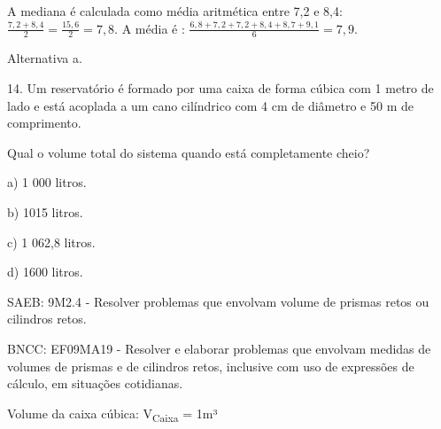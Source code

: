 \begin{escolha}
\begin{boxmedio}
\begin{boxmedio}
{\begin{boxpeq}
\begin{boxpeq}
{\begin{boxpeq}
\begin{boxmedio}
\begin{boxmedio}
\begin{boxpeq}
\begin{boxmedio}
\begin{boxpeq}
\begin{boxpeq}
\begin{boxpeq}
\begin{boxpeq}
\begin{boxmedio}
{\begin{boxmedio}
\begin{boxmedio}
\begin{boxpeq}
\begin{boxmedio}
\begin{boxpeq}
\begin{boxpeq}
\begin{boxpeq}
\begin{escolha}
{\begin{boxmedio}
\begin{boxpeq}
\begin{boxpeq}
\begin{boxpeq}
\begin{boxpeq}
\begin{boxpeq}
\begin{boxmedio}
\begin{boxpeq}
\begin{boxpeq}
\begin{boxpeq}
{\begin{boxpeq}
\begin{boxmedio}
\begin{boxpeq}
\begin{boxpeq}
\begin{boxpeq}
{\begin{boxpeq}
\begin{boxmedio}
{\begin{boxpeq}
\begin{boxpeq}
\begin{boxmedio}
\begin{boxmedio}
\begin{boxpeq}
\begin{boxpeq}
{\begin{boxpeq}
\begin{boxpeq}
\begin{boxpeq}
\begin{boxpeq}
\begin{boxpeq}
\begin{escolha}
\begin{escolha}
{\begin{boxmedio}
\begin{boxpeq}
\begin{q°}
\begin{boxmedio}
\begin{boxpeq}
\begin{boxpeq}
\begin{boxmedio}
\begin{boxmedio}
\begin{boxmedio}
\begin{boxmedio}
{\begin{escolha}
\begin{escolha}
\begin{escolha}
\begin{escolha}
\begin{escolha}
\begin{escolha}
{A mediana é calculada como média aritmética entre 7,2 e 8,4:
$\frac{7,2 + 8,4}{2} = \frac{15,6}{2} = 7,8$. A média é :
$\frac{6,8 + 7,2 + 7,2 + 8,4 + 8,7 + 9,1}{6} = 7,9$.

Alternativa a.

14. Um reservatório é formado por uma caixa de forma cúbica com 1 metro
de lado e está acoplada a um cano cilíndrico com 4 cm de diâmetro e 50 m
de comprimento.

Qual o volume total do sistema quando está completamente cheio?

a) 1 000 litros.

b) 1015 litros.

c) 1 062,8 litros.

d) 1600 litros.

SAEB: 9M2.4 - Resolver problemas que envolvam volume de prismas retos ou
cilindros retos.

BNCC: EF09MA19 - Resolver e elaborar problemas que envolvam medidas de
volumes de prismas e de cilindros retos, inclusive com uso de expressões
de cálculo, em situações cotidianas.

Volume da caixa cúbica: V\textsubscript{Caixa} = 1m³

}
\end{escolha}
\end{escolha}
\end{escolha}
\end{escolha}
\end{escolha}
\end{escolha}}
\end{boxmedio}
\end{boxmedio}
\end{boxmedio}
\end{boxmedio}
\end{boxpeq}
\end{boxpeq}
\end{boxmedio}
\end{q°}
\end{boxpeq}
\end{boxmedio}}
\end{escolha}
\end{escolha}
\end{boxpeq}
\end{boxpeq}
\end{boxpeq}
\end{boxpeq}
\end{boxpeq}}
\end{boxpeq}
\end{boxpeq}
\end{boxmedio}
\end{boxmedio}
\end{boxpeq}
\end{boxpeq}}
\end{boxmedio}
\end{boxpeq}}
\end{boxpeq}
\end{boxpeq}
\end{boxpeq}
\end{boxmedio}
\end{boxpeq}}
\end{boxpeq}
\end{boxpeq}
\end{boxpeq}
\end{boxmedio}
\end{boxpeq}
\end{boxpeq}
\end{boxpeq}
\end{boxpeq}
\end{boxpeq}
\end{boxmedio}}
\end{escolha}
\end{boxpeq}
\end{boxpeq}
\end{boxpeq}
\end{boxmedio}
\end{boxpeq}
\end{boxmedio}
\end{boxmedio}}
\end{boxmedio}
\end{boxpeq}
\end{boxpeq}
\end{boxpeq}
\end{boxpeq}
\end{boxmedio}
\end{boxpeq}
\end{boxmedio}
\end{boxmedio}
\end{boxpeq}}
\end{boxpeq}
\end{boxpeq}}
\end{boxmedio}
\end{boxmedio}
\end{escolha}
